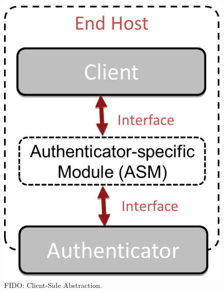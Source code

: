 \documentclass[peerreview, a4paper, 7pt]{IEEEtran}
\begin{document}
\begin{figure}[!htbp]
 \centering
 \includegraphics[scale=0.30]{asm.eps}
 \caption{FIDO: Client-Side Abstraction.}
 \label{asm-figure}
\end{figure}
\end{document}
